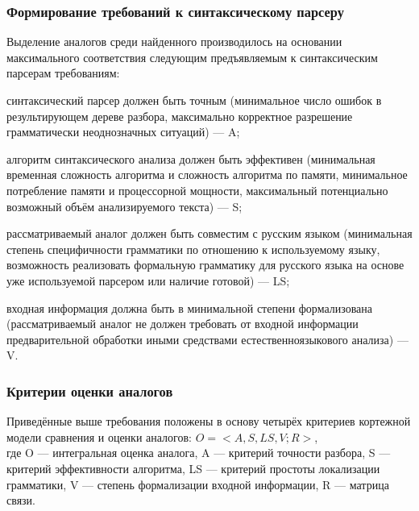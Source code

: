 \subsubsection{Формирование требований к синтаксическому парсеру}
Выделение аналогов среди найденного производилось на основании максимального соответствия следующим предъявляемым к синтаксическим парсерам требованиям:
\begin{list}{}{\leftmargin=1.5cm}
	\item синтаксический парсер должен быть точным (минимальное число ошибок в результирующем дереве разбора, максимально корректное разрешение грамматически неоднозначных ситуаций) --- A;
	\item алгоритм синтаксического анализа должен быть эффективен (минимальная временная сложность алгоритма и сложность алгоритма по памяти, минимальное потребление памяти и процессорной мощности, максимальный потенциально возможный объём анализируемого текста) --- S;
	\item рассматриваемый аналог должен быть совместим с русским языком (минимальная степень специфичности грамматики по отношению к используемому языку, возможность реализовать формальную грамматику для русского языка на основе уже используемой парсером или наличие готовой) --- LS;
	\item входная информация должна быть в минимальной степени формализована (рассматриваемый аналог не должен требовать от входной информации предварительной обработки иными средствами естественноязыкового анализа) --- V.
\end{list}

\subsubsection{Критерии оценки аналогов}
Приведённые выше требования положены в основу четырёх критериев кортежной модели сравнения и оценки аналогов: $O = <A, S, LS, V; R>$,\\
где O --- интегральная оценка аналога, A --- критерий точности разбора, S --- критерий эффективности алгоритма, LS --- критерий простоты локализации грамматики, V --- степень формализации входной информации, R --- матрица связи.

